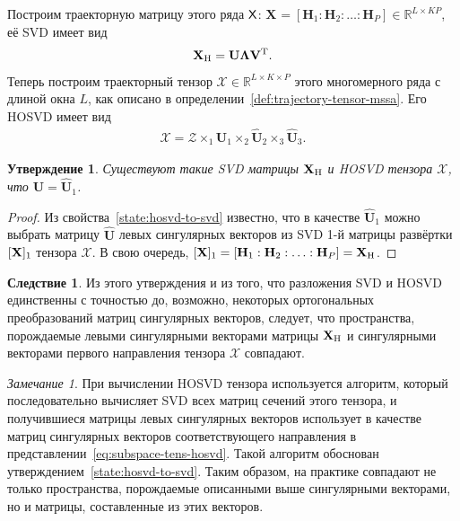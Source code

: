\documentclass[specialist,
  substylefile=spbu.rtx,
subf,href,colorlinks=true, 12pt]{disser}
\theoremstyle{plain}
\newtheorem{statement}{Утверждение}[section]
\theoremstyle{definition}
\newtheorem*{corollary}{Следствие}
\theoremstyle{remark}
\newtheorem*{remark}{Замечание}
\begin{document}
Построим траекторную матрицу этого ряда $\mathsf{X}$:
$\mathbf{X}_{} = [\mathbf{H}_1: \mathbf{H}_2: \ldots: \mathbf{H}_P] \in \mathbb{R}^{L\times KP}$,
её SVD имеет вид
\begin{gather*}
  \mathbf{X}_{\mathrm{H}} =\mathbf{U} \mathbf{\Lambda} \mathbf{V}^{\mathrm{T}}.
\end{gather*}
Теперь построим траекторный тензор $\mathcal{X}\in \mathbb{R}^{L\times K \times P}$ этого многомерного ряда
с длиной окна $L$, как описано в определении~\ref{def:trajectory-tensor-mssa}.
Его HOSVD имеет вид
\begin{gather}
  \mathcal{X}=\mathcal{Z} \times_1 \widehat{\mathbf{U}}_1 \times_2 \widehat{\mathbf{U}}_2
  \times_3 \widehat{\mathbf{U}}_3.
  \label{eq:subspace-tens-hosvd}
\end{gather}

\begin{statement}
  Существуют такие \emph{SVD} матрицы $\mathbf{X}_{\mathrm{H}}$ и \emph{HOSVD} тензора $\mathcal{X}$, что
  $\mathbf{U} = \widehat{\mathbf{U}}_1$.\label{state:tens-mssa-rank}
\end{statement}

\begin{proof}
  Из свойства~\ref{state:hosvd-to-svd} известно, что в качестве $\widehat{\mathbf{U}}_1$ можно выбрать матрицу
  $\widehat{\mathbf{U}}$ левых сингулярных векторов из SVD 1-й матрицы развёртки $[\mathbf{X}]_{1}$
  тензора $\mathcal{X}$.
  В свою очередь, $[\mathbf{X}]_{1} = [\mathbf{H}_1: \mathbf{H}_2: \ldots: \mathbf{H}_P] = \mathbf{X}_{\mathrm{H}}$.
\end{proof}

\begin{corollary}
  Из этого утверждения и из того, что разложения SVD и HOSVD единственны с точностью
  до, возможно, некоторых ортогональных преобразований матриц сингулярных векторов,
  следует, что пространства, порождаемые левыми сингулярными векторами матрицы $\mathbf{X}_{\mathrm{H}}$
  и сингулярными векторами первого направления тензора $\mathcal{X}$ совпадают.
\end{corollary}

\begin{remark}
  При вычислении HOSVD тензора используется алгоритм, который последовательно вычисляет SVD всех матриц сечений
  этого тензора, и получившиеся матрицы левых сингулярных векторов использует в качестве матриц сингулярных
  векторов соответствующего направления в представлении~\eqref{eq:subspace-tens-hosvd}.
  Такой алгоритм обоснован утверждением~\ref{state:hosvd-to-svd}.
  Таким образом, на практике совпадают не только пространства, порождаемые описанными выше сингулярными векторами,
  но и матрицы, составленные из этих векторов.
\end{remark}
\end{document}
